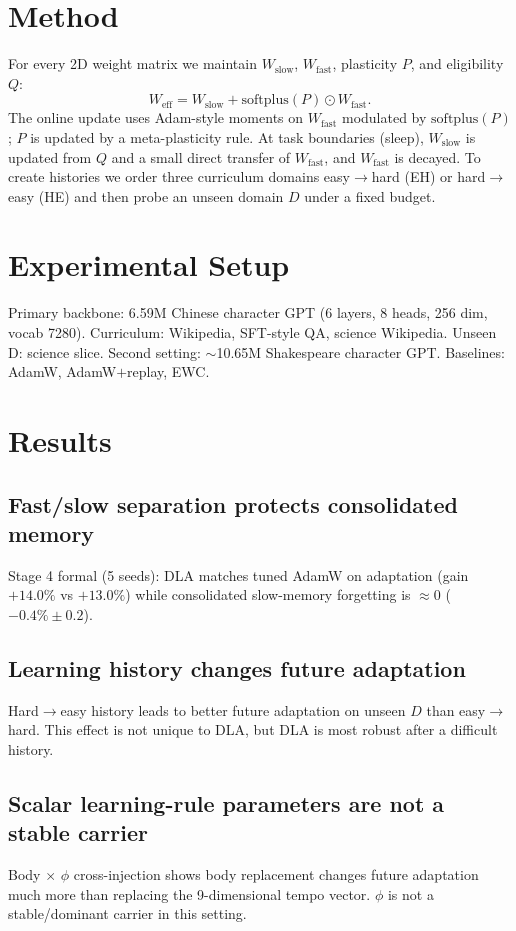 \documentclass[11pt]{article}
\newcommand{\Wfast}{W_{\mathrm{fast}}}
\newcommand{\Wslow}{W_{\mathrm{slow}}}
\begin{document}
\section{Method}
For every 2D weight matrix we maintain $\Wslow$, $\Wfast$, plasticity $P$, and eligibility $Q$:
\begin{equation}
  W_{\mathrm{eff}} = \Wslow + \mathrm{softplus}(P) \odot \Wfast.
\end{equation}
The online update uses Adam-style moments on $\Wfast$ modulated by $\mathrm{softplus}(P)$; $P$ is updated by a meta-plasticity rule. At task boundaries (sleep), $\Wslow$ is updated from $Q$ and a small direct transfer of $\Wfast$, and $\Wfast$ is decayed.
To create histories we order three curriculum domains easy$\to$hard (EH) or hard$\to$easy (HE) and then probe an unseen domain $D$ under a fixed budget.

\section{Experimental Setup}
Primary backbone: 6.59M Chinese character GPT (6 layers, 8 heads, 256 dim, vocab 7280). Curriculum: Wikipedia, SFT-style QA, science Wikipedia. Unseen D: science slice. Second setting: $\sim$10.65M Shakespeare character GPT. Baselines: AdamW, AdamW$+$replay, EWC.

\section{Results}

\subsection{Fast/slow separation protects consolidated memory}
Stage 4 formal (5 seeds): DLA matches tuned AdamW on adaptation (gain $+14.0\%$ vs $+13.0\%$) while consolidated slow-memory forgetting is $\approx 0$ ($-0.4\%\pm0.2$).

\subsection{Learning history changes future adaptation}
Hard$\to$easy history leads to better future adaptation on unseen $D$ than easy$\to$hard. This effect is not unique to DLA, but DLA is most robust after a difficult history.

\subsection{Scalar learning-rule parameters are not a stable carrier}
Body $\times$ $\phi$ cross-injection shows body replacement changes future adaptation much more than replacing the 9-dimensional tempo vector. $\phi$ is not a stable/dominant carrier in this setting.
\end{document}

